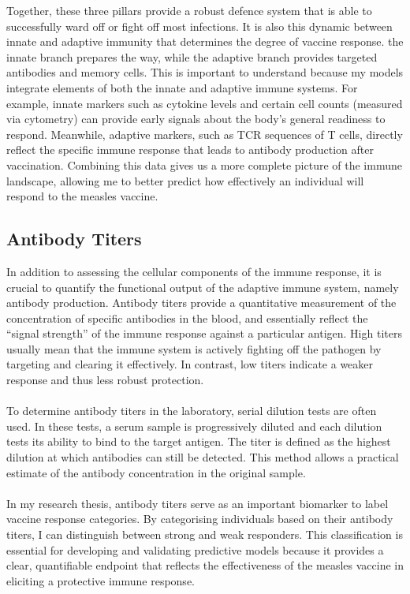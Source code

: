 \documentclass[12pt,a4paper]{report}
\begin{document}
Together, these three pillars provide a robust defence system that is able to successfully ward off or fight off most infections. It is also this dynamic between innate and adaptive immunity that determines the degree of vaccine response. the innate branch prepares the way, while the adaptive branch provides targeted antibodies and memory cells. This is important to understand because my models integrate elements of both the innate and adaptive immune systems. For example, innate markers such as cytokine levels and certain cell counts (measured via cytometry) can provide early signals about the body's general readiness to respond. Meanwhile, adaptive markers, such as TCR sequences of T cells, directly reflect the specific immune response that leads to antibody production after vaccination. Combining this data gives us a more complete picture of the immune landscape, allowing me to better predict how effectively an individual will respond to the measles vaccine.

\subsection{Antibody Titers }
In addition to assessing the cellular components of the immune response, it is crucial to quantify the functional output of the adaptive immune system, namely antibody production. Antibody titers provide a quantitative measurement of the concentration of specific antibodies in the blood, and essentially reflect the “signal strength” of the immune response against a particular antigen. High titers usually mean that the immune system is actively fighting off the pathogen by targeting and clearing it effectively. In contrast, low titers indicate a weaker response and thus less robust protection.\\
\\
To determine antibody titers in the laboratory, serial dilution tests are often used. In these tests, a serum sample is progressively diluted and each dilution tests its ability to bind to the target antigen. The titer is defined as the highest dilution at which antibodies can still be detected. This method allows a practical estimate of the antibody concentration in the original sample.\\
\\
In my research thesis, antibody titers serve as an important biomarker to label vaccine response categories. By categorising individuals based on their antibody titers, I can distinguish between strong and weak responders. This classification is essential for developing and validating predictive models because it provides a clear, quantifiable endpoint that reflects the effectiveness of the measles vaccine in eliciting a protective immune response.
\end{document}
